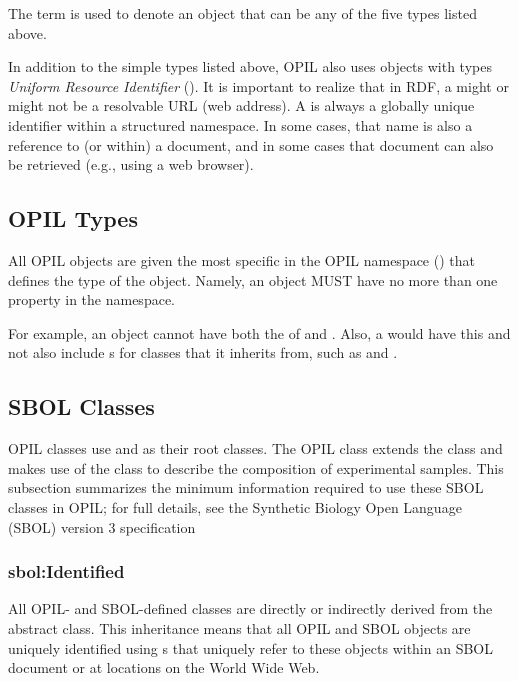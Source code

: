The term  is used to denote an object that can be any of the five types listed above.

In addition to the simple types listed above, OPIL also uses objects with types \emph{Uniform Resource Identifier} (). It is important to realize that in RDF, a  might or might not be a resolvable URL (web address).  A  is always a globally unique identifier within a structured namespace.  In some cases, that name is also a reference to (or within) a document, and in some cases that document can also be retrieved (e.g., using a web browser).

\subsection{OPIL Types}
\label{sec:sbolTypes}

All OPIL objects are given the most specific  in the OPIL namespace () that defines the type of the object.  Namely, an object MUST have no more than one  property in the  namespace.

For example, an object cannot have both the  of  and .  Also, a  would have this  and not also include s for classes that it inherits from, such as  and .

\subsection{SBOL Classes}

OPIL classes use  and  as their root classes.
The OPIL  class extends the  class and makes use of the  class to describe the composition of experimental samples.
This subsection summarizes the minimum information required to use these SBOL classes in OPIL; for full details, see the Synthetic Biology Open Language (SBOL) version 3 specification~\citep{SBOL3}

\subsubsection{sbol:Identified}
\label{sec:sbol:Identified}

All OPIL- and SBOL-defined classes are directly or indirectly derived from the   abstract class.
This inheritance means that all OPIL and SBOL objects are uniquely identified using s that uniquely refer to these objects within an SBOL document or at locations on the World Wide Web.

